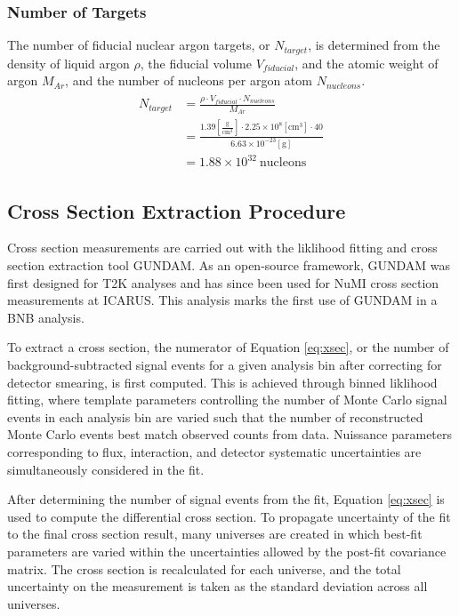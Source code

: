 \documentclass[../main.tex]{subfiles}
\begin{document}
\subsubsection{Number of Targets}
The number of fiducial nuclear argon targets, or $N_{target}$, is determined from the density of liquid argon $\rho$, the fiducial volume $V_{fiducial}$, and the atomic weight of argon $M_{Ar}$, and the number of nucleons per argon atom $N_{nucleons}$.
\begin{align}
\begin{split}
    N_{target} &= \frac{\rho \cdot V_{fiducial} \cdot N_{nucleons}}{M_{Ar}} \\
    &= \frac{1.39 [\frac{\text{g}}{\text{cm}^{3}}] \cdot 2.25 \times 10^{8} [\text{cm}^{3}] \cdot 40}{6.63 \times 10^{-23} [\text{g}]} \\
    &= 1.88 \times 10^{32} \ \text{nucleons}
\end{split}
\end{align}

\subsection{Cross Section Extraction Procedure}
Cross section measurements are carried out with the liklihood fitting and cross section extraction tool GUNDAM.  As an open-source framework, GUNDAM was first designed for T2K analyses and has since been used for NuMI cross section measurements at ICARUS.  This analysis marks the first use of GUNDAM in a BNB analysis.

To extract a cross section, the numerator of Equation \eqref{eq:xsec}, or the number of background-subtracted signal events for a given analysis bin after correcting for detector smearing, is first computed.  This is achieved through binned liklihood fitting, where template parameters controlling the number of Monte Carlo signal events in each analysis bin are varied such that the number of reconstructed Monte Carlo events best match observed counts from data.  Nuissance parameters corresponding to flux, interaction, and detector systematic uncertainties are simultaneously considered in the fit.

After determining the number of signal events from the fit, Equation \eqref{eq:xsec} is used to compute the differential cross section.  To propagate uncertainty of the fit to the final cross section result, many universes are created in which best-fit parameters are varied within the uncertainties allowed by the post-fit covariance matrix.  The cross section is recalculated for each universe, and the total uncertainty on the measurement is taken as the standard deviation across all universes.
\end{document}
